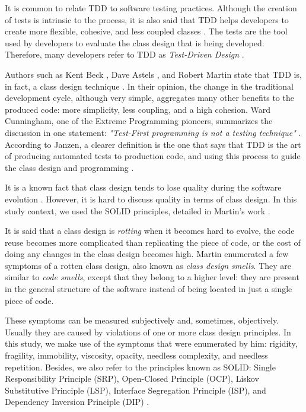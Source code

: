 \documentclass[times]{speauth}
\begin{document}
It is common to relate TDD to software testing practices. Although the creation
of tests is intrinsic to the process, it is also said that TDD helps developers
to create more flexible, cohesive, and less coupled classes \cite{tdd-taxonomy}. 
The tests are the tool used by developers to evaluate the class design that is being developed.
Therefore, many developers refer to TDD 
as \textit{Test-Driven Design} \cite{tdd-taxonomy}.

Authors such as Kent Beck \cite{aim-fire}, Dave Astels \cite{astels-tdd}, and
Robert Martin \cite{bob-martin} state that TDD is, in fact, a class design
technique \cite{tdd-taxonomy} \cite{aim-fire}.
In their opinion, the change in the traditional development cycle, although very simple,
aggregates many other benefits to the produced code: more simplicity, less coupling, and
a high cohesion. Ward Cunningham, one of the Extreme Programming pioneers, summarizes
the discussion in one statement: \textit{"Test-First programming is not a testing technique"} 
\cite{aim-fire}.
According to Janzen, a clearer definition is the one that says that TDD is the 
art of producing automated tests to production code, and using this process to guide
the class design and programming \cite{agilealliance-tdd} \cite{tdd-taxonomy}.

It is a known fact that class design tends to lose quality during the software evolution \cite{evolution-lehman}.
However, it is hard to discuss quality in terms of class design. In this study context,
we used the SOLID principles, detailed in Martin's work \cite{bob-martin}.

It is said that a class design is \textit{rotting} when it becomes hard
to evolve, the code reuse becomes more complicated than replicating the piece
of code, or the cost of doing any changes in the class design becomes high.
Martin \cite{bob-martin} enumerated a few symptoms of a rotten class design,
also known as \textit{class design smells}. They are similar to \textit{code smells},
except that they belong to a higher level: they are present in the general structure
of the software instead of being located in just a single piece of code.

These symptoms can be measured subjectively and, sometimes, objectively. Usually
they are caused by violations of one or more class design principles.
In this study, we make use of the symptoms that were enumerated by him: 
rigidity, fragility, immobility, viscosity, opacity, needless complexity, and
needless repetition. Besides, we also refer to the principles known as SOLID:
Single Responsibility Principle (SRP), Open-Closed Principle (OCP),
Liskov Substitutive Principle (LSP), Interface Segregation Principle (ISP), and
Dependency Inversion Principle (DIP) \cite{bob-martin}.
\end{document}
